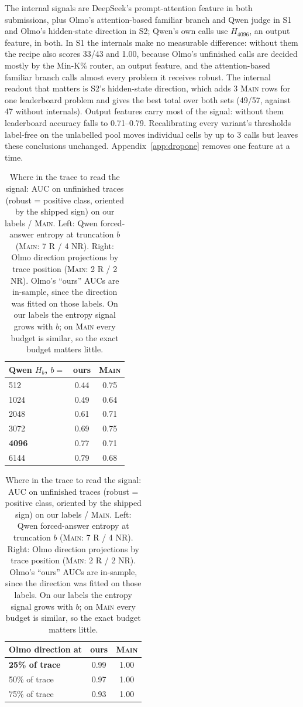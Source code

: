 \documentclass{article}
\newcommand{\sone}{\textsc{S1}}
\newcommand{\stwo}{\textsc{S2}}
\begin{document}
The internal signals are DeepSeek's prompt-attention feature in both submissions, plus Olmo's attention-based familiar branch and Qwen judge in \sone{} and Olmo's hidden-state direction in \stwo{}; Qwen's own calls use $H_{4096}$, an output feature, in both. In \sone{} the internals make no measurable difference: without them the recipe also scores 33/43 and 1.00, because Olmo's unfinished calls are decided mostly by the Min-K\% router, an output feature, and the attention-based familiar branch calls almost every problem it receives robust. The internal readout that matters is \stwo{}'s hidden-state direction, which adds 3 \textsc{Main} rows for one leaderboard problem and gives the best total over both sets (49/57, against 47 without internals). Output features carry most of the signal: without them leaderboard accuracy falls to 0.71--0.79. Recalibrating every variant's thresholds label-free on the unlabelled pool moves individual cells by up to 3 calls but leaves these conclusions unchanged. Appendix~\ref{app:dropone} removes one feature at a time.

\begin{table}[t]
\caption{Where in the trace to read the signal: AUC on unfinished traces (robust = positive class, oriented by the shipped sign) on our labels / \textsc{Main}. Left: Qwen forced-answer entropy at truncation $b$ (\textsc{Main}: 7 R / 4 NR). Right: Olmo direction projections by trace position (\textsc{Main}: 2 R / 2 NR). Olmo's ``ours'' AUCs are in-sample, since the direction was fitted on those labels. On our labels the entropy signal grows with $b$; on \textsc{Main} every budget is similar, so the exact budget matters little.}
\label{tab:position}
\centering\small
\begin{tabular}{lcc}
\toprule
Qwen $H_b$, $b=$ & ours & \textsc{Main} \\
\midrule
512  & 0.44 & 0.75 \\
1024 & 0.49 & 0.64 \\
2048 & 0.61 & 0.71 \\
3072 & 0.69 & 0.75 \\
\textbf{4096} & 0.77 & 0.71 \\
6144 & 0.79 & 0.68 \\
\bottomrule
\end{tabular}\hfill
\begin{tabular}{lcc}
\toprule
Olmo direction at & ours & \textsc{Main} \\
\midrule
\textbf{25\% of trace} & 0.99 & 1.00 \\
50\% of trace & 0.97 & 1.00 \\
75\% of trace & 0.93 & 1.00 \\
\bottomrule
\end{tabular}
\end{table}
\end{document}
